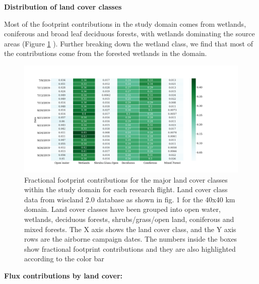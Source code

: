 \documentclass[draft]{agujournal2019}
\begin{document}
\textbf{Distribution of land cover classes}

Most of the footprint contributions in the study domain comes from wetlands, coniferous and  broad leaf deciduous forests, with wetlands dominating the source areas (Figure \ref{fig:footprint_fraction} ). Further breaking down the wetland class, we find that most of the contributions come from the forested wetlands in the domain.

 \begin{figure}[hbtp]
 \noindent\includegraphics[width=\textwidth]{footprint_fraction.png}
\caption{ Fractional  footprint contributions for the major land cover classes within the study domain for each research flight.  Land cover class data from wiscland 2.0 database as shown in fig. 1 for the 40x40 km domain. Land cover classes have been grouped into open water, wetlands, deciduous forests, shrubs/grass/open land, coniferous and mixed forests.  The X axis shows the land cover class, and the Y axis rows are the airborne campaign dates. The numbers inside the boxes show fractional footprint contributions and they are also highlighted according to the color bar}
\label{fig:footprint_fraction}
 \end{figure}

\textbf{Flux contributions by land cover:}
\end{document}
